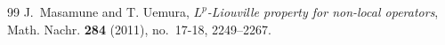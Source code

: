 \documentclass[12pt,a4paper]{article}
\newcommand{\1}{{\bf 1}}
\begin{document}
\begin{thebibliography}{99}
{J.~Masamune and T. Uemura}, 
\emph{$L^p$-Liouville property for non-local operators}, 
Math. Nachr. {\bf 284} (2011),  no.~17-18, 2249--2267. 


%
%


   
   
%








\end{thebibliography}
\end{document}
